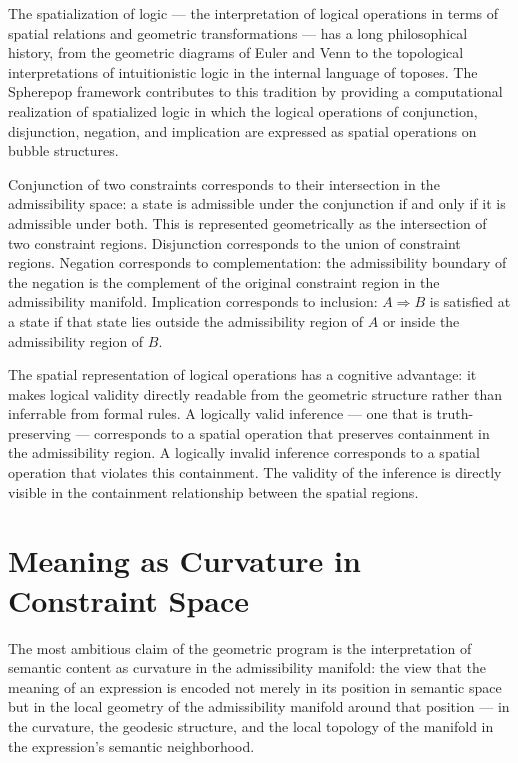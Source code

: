 \documentclass[12pt,openany]{book}
\theoremstyle{plain}
\theoremstyle{definition}
\theoremstyle{remark}
\begin{document}
The spatialization of logic — the interpretation of logical operations in terms of spatial relations and geometric transformations — has a long philosophical history, from the geometric diagrams of Euler and Venn to the topological interpretations of intuitionistic logic in the internal language of toposes. The Spherepop framework contributes to this tradition by providing a computational realization of spatialized logic in which the logical operations of conjunction, disjunction, negation, and implication are expressed as spatial operations on bubble structures.

Conjunction of two constraints corresponds to their intersection in the admissibility space: a state is admissible under the conjunction if and only if it is admissible under both. This is represented geometrically as the intersection of two constraint regions. Disjunction corresponds to the union of constraint regions. Negation corresponds to complementation: the admissibility boundary of the negation is the complement of the original constraint region in the admissibility manifold. Implication corresponds to inclusion: $A \Rightarrow B$ is satisfied at a state if that state lies outside the admissibility region of $A$ or inside the admissibility region of $B$.

The spatial representation of logical operations has a cognitive advantage: it makes logical validity directly readable from the geometric structure rather than inferrable from formal rules. A logically valid inference — one that is truth-preserving — corresponds to a spatial operation that preserves containment in the admissibility region. A logically invalid inference corresponds to a spatial operation that violates this containment. The validity of the inference is directly visible in the containment relationship between the spatial regions.

\section{Meaning as Curvature in Constraint Space}

The most ambitious claim of the geometric program is the interpretation of semantic content as curvature in the admissibility manifold: the view that the meaning of an expression is encoded not merely in its position in semantic space but in the local geometry of the admissibility manifold around that position — in the curvature, the geodesic structure, and the local topology of the manifold in the expression's semantic neighborhood.
\end{document}
